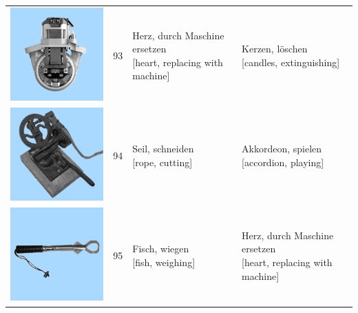 \documentclass[
  english,
  doc,12pt,twoside,floatsintext]{apa7}
\begin{document}
\begin{center}
\begin{ThreePartTable}
{\begin{longtable}{llll}
\includegraphics[valign=c, scale=0.23]{../materials/unfamiliar/93.png} & 93 & \makecell[l]{Herz, durch Maschine ersetzen\\{[heart, replacing with machine]}} & \makecell[l]{Kerzen, löschen\\{[candles, extinguishing]}}\\
\includegraphics[valign=c, scale=0.23]{../materials/unfamiliar/94.png} & 94 & \makecell[l]{Seil, schneiden\\{[rope, cutting]}} & \makecell[l]{Akkordeon, spielen\\{[accordion, playing]}}\\
\includegraphics[valign=c, scale=0.23]{../materials/unfamiliar/95.png} & 95 & \makecell[l]{Fisch, wiegen\\{[fish, weighing]}} & \makecell[l]{Herz, durch Maschine ersetzen\\{[heart, replacing with machine]}}\\

\end{longtable}}
\end{ThreePartTable}
\end{center}
\end{document}
